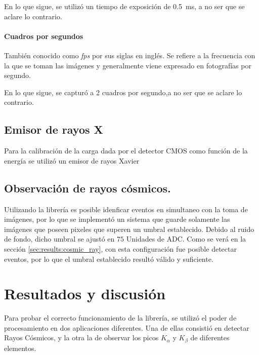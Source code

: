 \documentclass[twoside,twocolumn]{article}
\begin{document}
        En lo que sigue, se utilizó un tiempo de exposición de \SI{0.5}{\milli\second}, a no ser que se aclare lo contrario.

      \paragraph{Cuadros por segundos}
        También conocido como \emph{fps} por sus siglas en inglés.
        Se refiere a la frecuencia con la que se toman las imágenes y generalmente viene expresado en fotografías por segundo.
        
        En lo que sigue, se capturó a 2 cuadros por segundo,a no ser que se aclare lo contrario.


    \subsection{Emisor de rayos X}\label{sec:conf_exp:x-rays}
      Para la calibración de la carga dada por el detector CMOS como función de la energía se utilizó un emisor de rayos Xavier
  
    \subsection{Observación de rayos cósmicos.}\label{sec:conf_exp:cosmic_ray}
      Utilizando la librería es posible idenficar eventos en simultaneo con la toma de imágenes,
      por lo que se implementó un sistema que guarde solamente las imágenes que poseen pixeles que superen un umbral establecido.
      Debido al ruido de fondo, dicho umbral se ajustó en $75$ Unidades de ADC. 
      Como se verá en la sección \ref{sec:results:cosmic_ray}, con esta configuración fue posible detectar eventos,
      por lo que el umbral establecido resultó válido y suficiente.
  
  \section{Resultados y discusión}\label{sec:results}
    Para probar el correcto funcionamiento de la librería, se utilizó el poder de procesamiento en dos aplicaciones diferentes.
    Una de ellas consistió en detectar Rayos Cósmicos, y la otra la de observar los picos $K_{\alpha}$ y $K_{\beta}$ de diferentes elementos.
\end{document}
